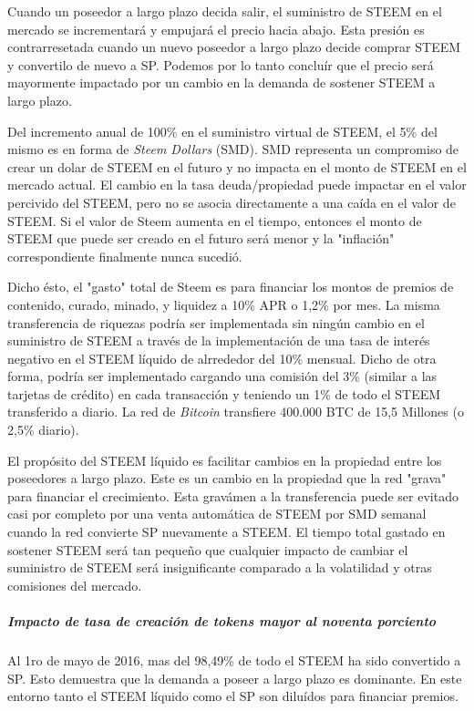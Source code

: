 \documentclass[a4paper,titlepage,final]{article}
\begin{document}
Cuando un poseedor a largo plazo decida salir, el suministro de STEEM en el mercado se incrementará y empujará el precio hacia abajo. Esta presión es contrarresetada cuando un nuevo poseedor a largo plazo decide comprar STEEM y convertilo de nuevo a SP. Podemos por lo tanto concluír que el precio será mayormente impactado por un cambio en la demanda de sostener STEEM a largo plazo.

Del incremento anual de 100\% en el suministro virtual de STEEM, el 5\% del mismo es en forma de \textit{Steem Dollars} (SMD). SMD representa un compromiso de crear un dolar de STEEM en el futuro y no impacta en el monto de STEEM en el mercado actual. El cambio en la tasa deuda/propiedad puede impactar en el valor percivido del STEEM, pero no se asocia directamente a una caída en el valor de STEEM. Si el valor de Steem aumenta en el tiempo, entonces el monto de STEEM que puede ser creado en el futuro será menor y la "inflación" correspondiente finalmente nunca sucedió.

Dicho ésto, el "gasto" total de Steem es para financiar los montos de premios de contenido, curado, minado, y liquidez a 10\% APR o 1,2\% por mes. La misma transferencia de riquezas podría ser implementada sin ningún cambio en el suministro de STEEM a través de la implementación de una tasa de interés negativo en el STEEM líquido de alrrededor del 10\% mensual. Dicho de otra forma, podría ser implementado cargando una comisión del 3\% (similar a las tarjetas de crédito) en cada transacción y teniendo un 1\% de todo el STEEM transferido a diario. La red de \textit{Bitcoin} transfiere\cite{19} 400.000 BTC de 15,5 Millones (o 2,5\% diario).

El propósito del STEEM líquido es facilitar cambios en la propiedad entre los poseedores a largo plazo. Este es un cambio en la propiedad que la red "grava" para financiar el crecimiento. Esta gravámen a la transferencia puede ser evitado casi por completo por una venta automática de STEEM por SMD semanal cuando la red convierte SP nuevamente a STEEM. El tiempo total gastado en sostener STEEM será tan pequeño que cualquier impacto de cambiar el suministro de STEEM será insignificante comparado a la volatilidad y otras comisiones del mercado.

\subparagraph{Impacto de tasa de creación de \textit{tokens} mayor al noventa porciento}

Al 1ro de mayo de 2016, mas del 98,49\% de todo el STEEM ha sido convertido a SP. Esto demuestra que la demanda a poseer a largo plazo es dominante. En este entorno tanto el STEEM líquido como el SP son diluídos para financiar premios.
\end{document}
